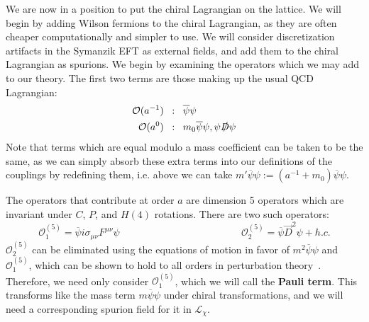\documentclass[11pt, oneside]{article}   	%
\theoremstyle{definition}
\begin{document}
We are now in a position to put the chiral Lagrangian on the lattice. We will begin by adding Wilson fermions to the 
chiral Lagrangian, as they are often cheaper computationally and simpler to use. We will consider discretization artifacts in 
the Symanzik EFT as external fields, and add them to the chiral Lagrangian as spurions. We begin by examining the 
operators which we may add to our theory. The first two terms are those making up the usual QCD Lagrangian:
\begin{align}
	\mathcal O(a^{-1})\;\;&:\;\;\overline\psi\psi \\
	\mathcal O(a^{0})\;\;&:\;\; m_0\overline\psi\psi, \psi \slashed D \psi \\
\end{align}
Note that terms which are equal modulo a mass coefficient can be taken to be the same, as we can simply absorb these 
extra terms into our definitions of the couplings by redefining them, i.e. above we can take $m'\overline\psi \psi := (a^{-1} + 
m_0)\overline\psi \psi$. 

The operators that contribute at order $a$ are dimension 5 operators which are invariant under $C$, $P$, and $H(4)$ 
rotations. There are two such operators:
\begin{equation}
\mathcal O^{(5)}_1 = \overline\psi i\sigma_{\mu\nu} F^{\mu\nu} \psi\;\;\;\;\;\;\;\;\;\;\;\;\;\;\;\;\;\;\;\;\;\;\;\;\;\;\;\;\;\;\;\;\;\;\;\;\;\;\;\;\;\;\;\;
\mathcal O^{(5)}_2 = \overline\psi \vec D^2\psi + h.c. 
\end{equation}
$\mathcal O_2^{(5)}$ can be eliminated using the equations of motion in favor of $m^2\overline \psi \psi$ and 
$\mathcal O_1^{(5)}$, which can be shown to hold to all orders in perturbation theory~\cite{oa_improvement}. Therefore, 
we need only consider $\mathcal O_1^{(5)}$, which we will call the \textbf{Pauli term}. This transforms like the mass term 
$m\overline\psi \psi$ under chiral transformations, and we will need a corresponding spurion field for it in $\mathcal L_\chi$. 
\end{document}
